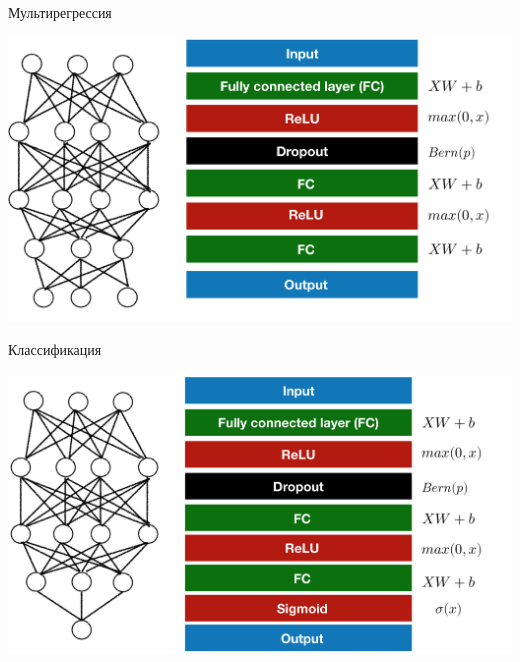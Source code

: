 \documentclass[notes,12pt, aspectratio=169]{beamer}
\begin{document}
\begin{frame}{Мультирегрессия}
\begin{center}
	\includegraphics[width=0.75\paperwidth]{nn_lego_regr.png}
\end{center}
\end{frame}



\begin{frame}{Классификация}
	\begin{center}
		\includegraphics[width=0.75\paperwidth]{lego_class_two.png}
	\end{center}
\end{frame}
\end{document}
